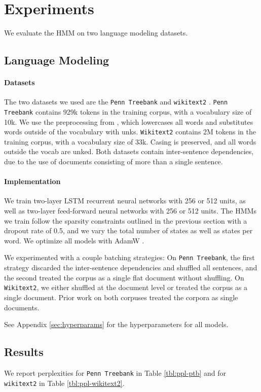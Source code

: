 \documentclass[11pt,a4paper]{article}
\begin{document}
\section{Experiments}
We evaluate the HMM on two language modeling datasets.

\subsection{Language Modeling}
\paragraph{Datasets}
The two datasets we used are the \texttt{Penn Treebank} \citep{ptb}
and \texttt{wikitext2} \citep{wikitext}.
\texttt{Penn Treebank} contains 929k tokens in the training corpus,
with a vocabulary size of 10k.
We use the preprocessing from \citet{mikolov-2011},
which lowercases all words and substitutes words outside of the vocabulary
with unks. 
\texttt{Wikitext2} contains 2M tokens in the training corpus,
with a vocabulary size of 33k.
Casing is preserved, and all words outside the vocab are unked.
Both datasets contain inter-sentence dependencies,
due to the use of documents consisting of more than a single sentence.

\paragraph{Implementation}
We train two-layer LSTM recurrent neural networks with 256 or 512 units,
as well as two-layer feed-forward neural networks with 256 or 512 units.
The HMMs we train follow the sparsity constraints outlined in the previous
section with a dropout rate of 0.5,
and we vary the total number of states as well as states per word.
We optimize all models with AdamW \citep{adamw}.

We experimented with a couple batching strategies:
On \texttt{Penn Treebank},
the first strategy discarded the inter-sentence dependencies and shuffled all sentences,
and the second treated the corpus as a single flat document without shuffling.
On \texttt{Wikitext2}, we either shuffled at the document level or treated the corpus as a
single document.
Prior work on both corpuses treated the corpora as single documents.

See Appendix \ref{sec:hyperparams} for the hyperparameters for all models.

\subsection{Results}
We report perplexities 
for \texttt{Penn Treebank} in Table \ref{tbl:ppl-ptb} and for 
\texttt{wikitext2} in Table \ref{tbl:ppl-wikitext2}.
\end{document}
